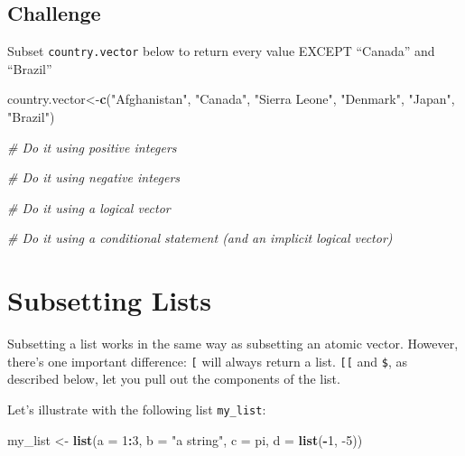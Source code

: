 \documentclass[]{book}
\newenvironment{Shaded}{\begin{snugshade}}{\end{snugshade}}
\newcommand{\CommentTok}[1]{\textcolor[rgb]{0.56,0.35,0.01}{\textit{#1}}}
\newcommand{\DataTypeTok}[1]{\textcolor[rgb]{0.13,0.29,0.53}{#1}}
\newcommand{\DecValTok}[1]{\textcolor[rgb]{0.00,0.00,0.81}{#1}}
\newcommand{\KeywordTok}[1]{\textcolor[rgb]{0.13,0.29,0.53}{\textbf{#1}}}
\newcommand{\NormalTok}[1]{#1}
\newcommand{\OperatorTok}[1]{\textcolor[rgb]{0.81,0.36,0.00}{\textbf{#1}}}
\newcommand{\StringTok}[1]{\textcolor[rgb]{0.31,0.60,0.02}{#1}}
\begin{document}
\hypertarget{challenge-1}{%
\subsection{Challenge}\label{challenge-1}}

Subset \texttt{country.vector} below to return every value EXCEPT ``Canada'' and ``Brazil''

\begin{Shaded}
\begin{Highlighting}[]
\NormalTok{country.vector<-}\KeywordTok{c}\NormalTok{(}\StringTok{"Afghanistan"}\NormalTok{, }\StringTok{"Canada"}\NormalTok{, }\StringTok{"Sierra Leone"}\NormalTok{, }\StringTok{"Denmark"}\NormalTok{, }\StringTok{"Japan"}\NormalTok{, }\StringTok{"Brazil"}\NormalTok{)}

\CommentTok{# Do it using positive integers}

\CommentTok{# Do it using negative integers}

\CommentTok{# Do it using a logical vector}

\CommentTok{# Do it using a conditional statement (and an implicit logical vector)}
\end{Highlighting}
\end{Shaded}

\hypertarget{subsetting-lists}{%
\section{Subsetting Lists}\label{subsetting-lists}}

Subsetting a list works in the same way as subsetting an atomic vector. However, there's one important difference: \texttt{{[}} will always return a list. \texttt{{[}{[}} and \texttt{\$}, as described below, let you pull out the components of the list.

Let's illustrate with the following list \texttt{my\_list}:

\begin{Shaded}
\begin{Highlighting}[]
\NormalTok{my_list <-}\StringTok{ }\KeywordTok{list}\NormalTok{(}\DataTypeTok{a =} \DecValTok{1}\OperatorTok{:}\DecValTok{3}\NormalTok{, }\DataTypeTok{b =} \StringTok{"a string"}\NormalTok{, }\DataTypeTok{c =}\NormalTok{ pi, }\DataTypeTok{d =} \KeywordTok{list}\NormalTok{(}\OperatorTok{-}\DecValTok{1}\NormalTok{, }\DecValTok{-5}\NormalTok{))}
\end{Highlighting}
\end{Shaded}
\end{document}
